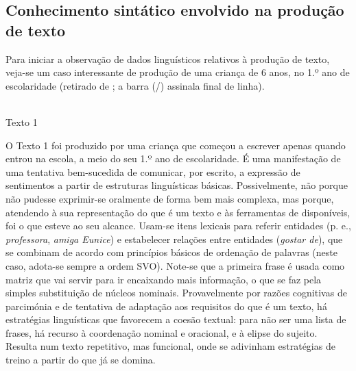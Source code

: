 \documentclass[output=paper]{LSP/langsci}
\begin{document}
\subsection{Conhecimento sintático envolvido na produção de texto}
\label{subsec:costacostagoncalves_conh_sint_text}

Para iniciar a observação de dados linguísticos relativos à produção de texto, veja\x-se um caso interessante de produção  de uma criança de 6 anos, no 1.º ano de escolaridade (retirado de \citealt{costa2008}; a barra (/) assinala final de linha). 

\begin{center}
\\\vspace{1em}Texto 1
\end{center}

O Texto 1 foi produzido por uma criança que começou a escrever apenas quando entrou na escola, a meio do seu 1.º ano de escolaridade. É uma manifestação de uma tentativa bem-sucedida de comunicar, por escrito, a expressão de sentimentos a partir de estruturas linguísticas básicas. Possivelmente, não porque não pudesse exprimir-se oralmente de forma bem mais complexa, mas porque, atendendo à sua representação do que é um texto e às ferramentas de  disponíveis, foi o que esteve ao seu alcance. Usam-se itens lexicais para referir entidades (p. e., \textit{professora}, \textit{amiga Eunice}) e estabelecer relações entre entidades (\textit{gostar de}), que se combinam de acordo com princípios básicos de ordenação de palavras (neste caso, adota-se sempre a ordem SVO). Note-se que a primeira frase é usada como matriz que vai servir para ir encaixando mais informação, o que se faz pela simples substituição de núcleos nominais. Provavelmente por razões cognitivas de parcimónia e de tentativa de adaptação aos requisitos do que é um texto, há estratégias linguísticas que favorecem a coesão textual: para não ser uma lista de frases, há recurso à coordenação nominal e oracional, e à elipse do sujeito. Resulta num texto repetitivo, mas funcional, onde se adivinham estratégias de treino a partir do que já se domina.
\end{document}
